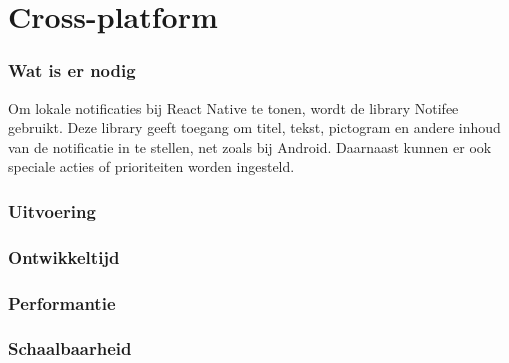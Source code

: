

\clearpage
\section{Cross-platform}
\subsubsection{Wat is er nodig}
Om lokale notificaties bij React Native te tonen, wordt de library Notifee gebruikt.
Deze library geeft toegang om titel, tekst, pictogram en 
andere inhoud van de notificatie in te stellen, net zoals bij Android. Daarnaast kunnen er ook speciale acties 
of prioriteiten worden ingesteld.

\subsubsection{Uitvoering}



\subsubsection{Ontwikkeltijd}



\subsubsection{Performantie}



\subsubsection{Schaalbaarheid}



